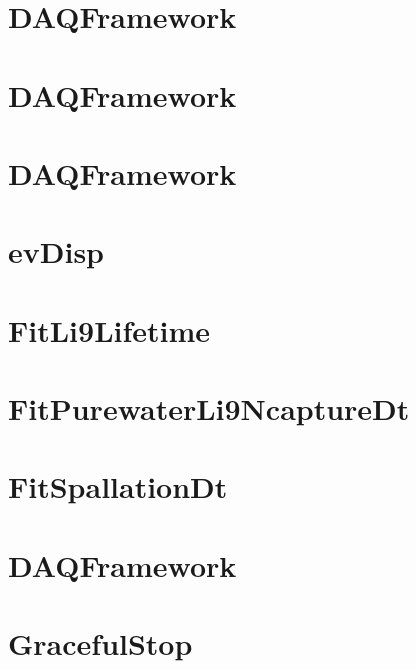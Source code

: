 \let\mypdfximage\pdfximage\def\pdfximage{\immediate\mypdfximage}\documentclass[twoside]{book}
\newcommand{\+}{\discretionary{\mbox{\scriptsize$\hookleftarrow$}}{}{}}
\begin{document}
\chapter{DAQFramework}
\label{md_UserTools_CutRecorder_README}

\chapter{DAQFramework}
\label{md_UserTools_DataQualityCuts_README}

\chapter{DAQFramework}
\label{md_UserTools_DefineSignalRegions_README}

\chapter{ev\+Disp}
\label{md_UserTools_evDisp_README}

\chapter{Fit\+Li9\+Lifetime}
\label{md_UserTools_FitLi9Lifetime_README}

\chapter{Fit\+Purewater\+Li9\+Ncapture\+Dt}
\label{md_UserTools_FitPurewaterLi9NcaptureDt_README}

\chapter{Fit\+Spallation\+Dt}
\label{md_UserTools_FitSpallationDt_README}

\chapter{DAQFramework}
\label{md_UserTools_FlagAFTs_README}

\chapter{Graceful\+Stop}
\label{md_UserTools_GracefulStop_README}

\end{document}
